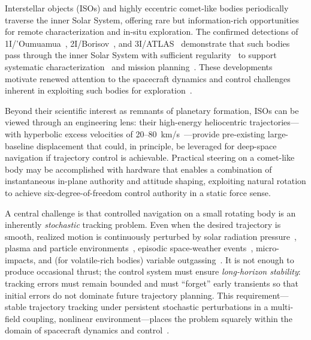 \documentclass{article}
\begin{document}
Interstellar objects (ISOs) and highly eccentric comet-like bodies periodically traverse the inner Solar System, offering rare but information-rich opportunities for remote characterization and in-situ exploration. The confirmed detections of 1I/\hspace{0pt}'Oumuamua~\cite{meech2017oumuamua}, 2I/Borisov~\cite{jewitt2019comet}, and 3I/ATLAS~\cite{loeb2025intercepting} demonstrate that such bodies pass through the inner Solar System with sufficient regularity~\cite{delaFuenteMarcos2024ejected} to support systematic characterization~\cite{eldadi2026ioss,jewitt2022interstellar,delaFuenteMarcos2025gtc} and mission planning~\cite{hein2022interstellar,seligman2018oumuamua,hibberd2020project,landau2023iso}. These developments motivate renewed attention to the spacecraft dynamics and control challenges inherent in exploiting such bodies for exploration~\cite{zhang2024advances_sdc}.

Beyond their scientific interest as remnants of planetary formation, ISOs can be viewed through an engineering lens: their high-energy heliocentric trajectories---with hyperbolic excess velocities of 20--80~km/s~\cite{jewitt2022interstellar}---provide pre-existing large-baseline displacement that could, in principle, be leveraged for deep-space navigation if trajectory control is achievable. Practical steering on a comet-like body may be accomplished with hardware that enables a combination of instantaneous in-plane authority and attitude shaping, exploiting natural rotation to achieve six-degree-of-freedom control authority in a static force sense.

A central challenge is that controlled navigation on a small rotating body is an inherently \emph{stochastic} tracking problem. Even when the desired trajectory is smooth, realized motion is continuously perturbed by solar radiation pressure~\cite{wertz1999spacecraft}, plasma and particle environments~\cite{jokipii1998particle,richardson2018solar}, episodic space-weather events~\cite{tsurutani2003extreme}, micro-impacts, and (for volatile-rich bodies) variable outgassing~\cite{mumma2011composition}. It is not enough to produce occasional thrust; the control system must ensure \emph{long-horizon stability}: tracking errors must remain bounded and must ``forget'' early transients so that initial errors do not dominate future trajectory planning. This requirement---stable trajectory tracking under persistent stochastic perturbations in a multi-field coupling, nonlinear environment---places the problem squarely within the domain of spacecraft dynamics and control~\cite{wie2008spacecraft,markley2014fundamentals,zhang2024advances_sdc}.
\end{document}
